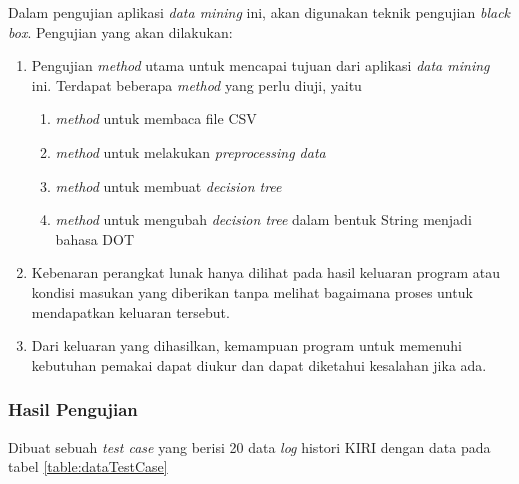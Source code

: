 Dalam pengujian aplikasi \textsl{data mining} ini, akan digunakan teknik pengujian \textsl{black box}. Pengujian yang akan dilakukan:
\begin{enumerate}
	\item Pengujian \textsl{method} utama untuk mencapai tujuan dari aplikasi \textsl{data mining} ini. Terdapat beberapa \textsl{method} yang perlu diuji, yaitu
	\begin{enumerate}
		\item \textsl{method} untuk membaca file CSV
		\item \textsl{method} untuk melakukan \textsl{preprocessing data}
		\item \textsl{method} untuk membuat \textsl{decision tree}
		\item \textsl{method} untuk mengubah \textsl{decision tree} dalam bentuk String menjadi bahasa DOT
	\end{enumerate}
	\item Kebenaran perangkat lunak hanya dilihat pada hasil keluaran program atau kondisi masukan yang diberikan tanpa melihat bagaimana proses untuk mendapatkan keluaran tersebut.
	\item Dari keluaran yang dihasilkan, kemampuan program untuk memenuhi kebutuhan pemakai dapat diukur dan dapat diketahui kesalahan jika ada.
\end{enumerate}


\subsubsection{Hasil Pengujian}

Dibuat sebuah \textsl{test case} yang berisi 20 data \textsl{log} histori KIRI dengan data pada tabel \ref{table:dataTestCase}

